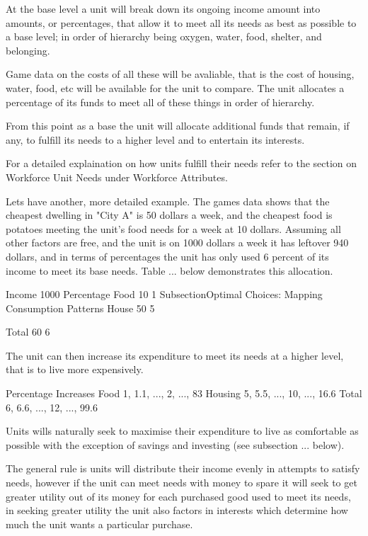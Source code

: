 
At the base level a unit will break down its ongoing income amount into amounts, or percentages, that allow it to meet all its needs as best as possible to a base level; in order of hierarchy being oxygen, water, food, shelter, and belonging.

Game data on the costs of all these will be avaliable, that is the cost of housing, water, food, etc will be available for the unit to compare. The unit  allocates a percentage of its funds to meet all of these things in order of hierarchy.

From this point as a base the unit will allocate additional funds that remain, if any, to fulfill its needs to a higher level and to entertain its interests. 

For a detailed explaination on how units fulfill their needs refer to the section on Workforce Unit Needs under Workforce Attributes.


Lets have another, more detailed example. The games data shows that the cheapest dwelling in "City A" is 50 dollars a week, and the cheapest food is potatoes  meeting the unit's food needs for a week at 10 dollars. Assuming all other factors are free, and the unit is on 1000 dollars a week it has leftover 940 dollars, and in terms of percentages the unit has only used 6 percent of its income to meet its base needs. Table ... below demonstrates this allocation.

Income	1000	
                    Percentage 
Food	  10	  	 1	Subsection{Optimal Choices: Mapping Consumption Patterns}
House	  50	  	 5

Total	  60	  	 6


The unit can then increase its expenditure to meet its needs at a higher level, that is to live more expensively.

	 Percentage Increases	
Food	 1, 1.1, ...,  2,  ...,  83 
Housing	 5, 5.5, ..., 10,  ...,  16.6
Total	 6, 6.6, ..., 12,  ...,  99.6

Units wills naturally seek to maximise their expenditure to live as comfortable as possible with the exception of savings and investing (see subsection ... below).

The general rule is units will distribute their income evenly in attempts to satisfy needs, however if the unit can meet needs with money to spare it will seek to get greater utility out of its money for each purchased good used to meet its needs, in seeking greater utility the unit also factors in interests which determine how much the unit wants a particular purchase.


